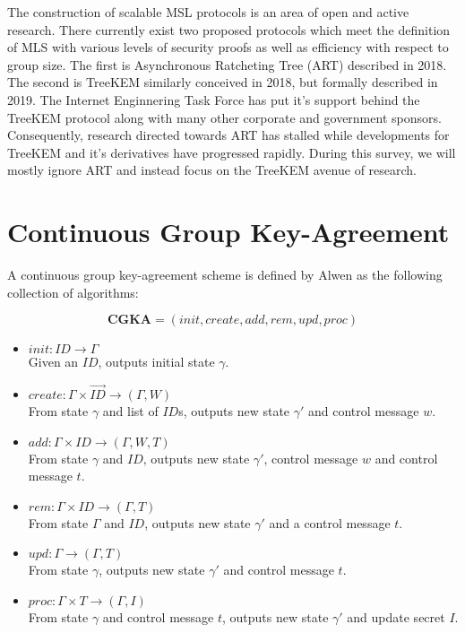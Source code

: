\documentclass[12pt,twocolumn]{article}
\begin{document}
	The construction of scalable MSL protocols is an area of open and active research.
	There currently exist two proposed protocols which meet the definition of MLS with various levels of security proofs as well as efficiency with respect to group size.
	The first is Asynchronous Ratcheting Tree (ART) \cite{cohn2018ends} described in 2018.
	The second is TreeKEM \cite{bhargavan:hal-02425247} similarly conceived in 2018, but formally described in 2019.
	The Internet Enginnering Task Force has put it's support behind the TreeKEM protocol along with many other corporate and government sponsors.
	Consequently, research directed towards ART has stalled while developments for TreeKEM and it's derivatives have progressed rapidly.
	During this survey, we will mostly ignore ART and instead focus on the TreeKEM avenue of research.
	
	\section*{Continuous Group Key-Agreement}
	
	A continuous group key-agreement scheme is defined by Alwen \cite{alwen2020security} as the following collection of algorithms:
	
	$$ \textbf{CGKA} = (init, create, add, rem, upd, proc)$$

	\begin{itemize}
	
	\item $init : ID \to \Gamma$\\
	Given an $ID$, outputs initial state $\gamma$.
	
	\item $create : \Gamma \times \overrightarrow{ID} \to (\Gamma, W)$\\
	From state $\gamma$ and list of $ID$s, outputs new state $\gamma'$ and control message $w$.
	
	\item $add : \Gamma \times ID \to (\Gamma, W, T)$\\
	From state $\gamma$ and $ID$, outputs new state $\gamma'$, control message $w$ and control message $t$.
	
	\item $rem : \Gamma \times ID \to (\Gamma, T)$\\
	From state $\Gamma$ and $ID$, outputs new state $\gamma'$ and a control message $t$.
	
	\item $upd : \Gamma \to (\Gamma, T)$\\
	From state $\gamma$, outputs new state $\gamma'$ and control message $t$.
	
	\item $proc : \Gamma \times T \to (\Gamma, I)$\\
	From state $\gamma$ and control message $t$, outputs new state $\gamma'$ and update secret $I$.
	\end{itemize}
\end{document}
